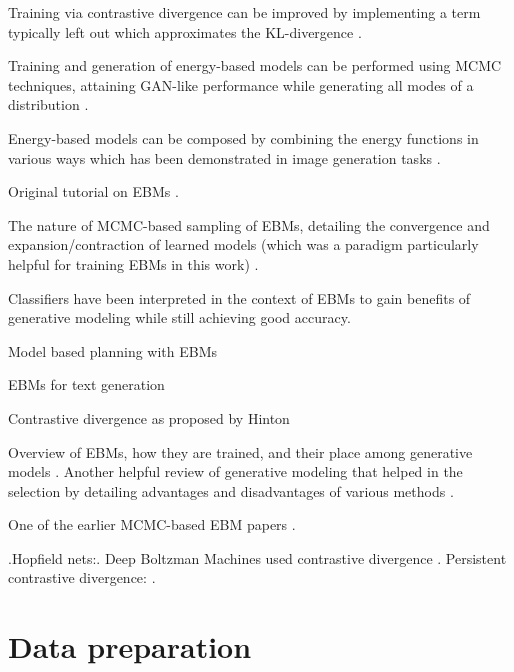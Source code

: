 Training via contrastive divergence can be improved by implementing a term typically left out which approximates the KL-divergence \cite{du_improved_2021}. 

Training and generation of energy-based models can be performed using MCMC techniques, attaining GAN-like performance while generating all modes of a distribution \cite{du_implicit_2020}.

Energy-based models can be composed by combining the energy functions in various ways which has been demonstrated in image generation tasks \cite{du_compositional_2020, du_unsupervised_2021}.

Original tutorial on EBMs .

The nature of MCMC-based sampling of EBMs, detailing the convergence and expansion/contraction of learned models (which was a paradigm particularly helpful for training EBMs in this work) \cite{nijkamp_anatomy_2020, nijkamp_learning_2019}.

Classifiers have been interpreted in the context of EBMs to gain benefits of generative modeling while still achieving good accuracy.

Model based planning with EBMs \cite{du_model_2019}

EBMs for text generation \cite{deng_residual_2020}

Contrastive divergence as proposed by Hinton \cite{hinton_training_2002}



Overview of EBMs, how they are trained, and their place among generative models \cite{carbone_hitchhikers_2024}. Another helpful review of generative modeling that helped in the selection by detailing advantages and disadvantages of various methods \cite{bond-taylor_deep_2021}.

One of the earlier MCMC-based EBM papers \cite{gao_learning_2018}.

.Hopfield nets:. Deep Boltzman Machines used contrastive divergence \cite{ruslan_deep_2009}. Persistent contrastive divergence: \cite{tieleman_training_2008}.


\section{Data preparation}

